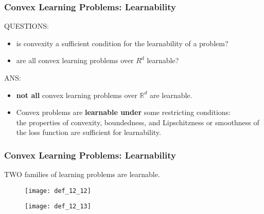\begin{frame}
\frametitle{Convex Learning Problems: Learnability}
QUESTIONS:
\begin{itemize}
    \item is convexity a sufficient condition for the learnability of a problem?
    \item are all convex learning problems over $R^d$ learnable?
\end{itemize}
\vspace{5mm}

ANS:\\
\begin{itemize}
    \item \textbf{not all} convex learning problems over $\mathbb{R}^d$ are learnable.
    \item Convex problems are \textbf{learnable under} some restricting conditions:\\
        the properties of convexity, boundedness, and Lipschitzness or smoothness
        of the loss function are sufficient for learnability.
\end{itemize}

\end{frame}

\begin{frame}
\frametitle{Convex Learning Problems: Learnability}
TWO families of learning problems are learnable.

\noindent\makebox[\linewidth]{\rule{\paperwidth}{0.4pt}}

\begin{figure}
    \centering
    \texttt{[image: def\_12\_12]}
\end{figure}

\noindent\makebox[\linewidth]{\rule{\paperwidth}{0.4pt}}

\begin{figure}
    \centering
    \texttt{[image: def\_12\_13]}
\end{figure}

\end{frame}


